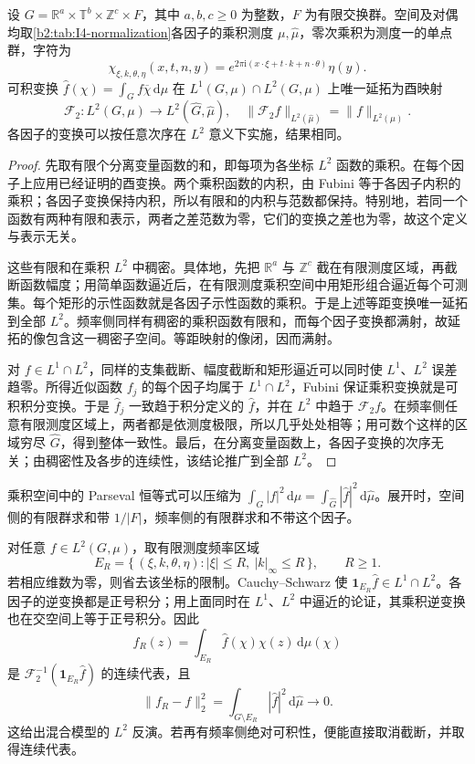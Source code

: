 \begin{proposition}\label{b2:prop:I4-product-plancherel}
设 \(G=\mathbb R^a\times\mathbb T^b\times\mathbb Z^c\times F\)，其中 \(a,b,c\ge0\) 为整数，\(F\) 为有限交换群。空间及对偶均取\cref{b2:tab:I4-normalization}各因子的乘积测度 \(\mu,\widehat\mu\)，零次乘积为测度一的单点群，字符为
\[
 \chi_{\xi,k,\theta,\eta}(x,t,n,y)
 =e^{2\pi\mathrm i(x\cdot\xi+t\cdot k+n\cdot\theta)}\eta(y).
\]
可积变换 \(\widehat f(\chi)=\int_G f\overline\chi\,\mathrm d\mu\) 在 \(L^1(G,\mu)\cap L^2(G,\mu)\) 上唯一延拓为酉映射
\[
 \mathcal F_2:L^2(G,\mu)\longrightarrow L^2(\widehat G,\widehat\mu),
 \quad \|\mathcal F_2f\|_{L^2(\widehat\mu)}=\|f\|_{L^2(\mu)}.
\]
各因子的变换可以按任意次序在 \(L^2\) 意义下实施，结果相同。
\end{proposition}
\begin{proof}
先取有限个分离变量函数的和，即每项为各坐标 \(L^2\) 函数的乘积。在每个因子上应用已经证明的酉变换。两个乘积函数的内积，由 Fubini 等于各因子内积的乘积；各因子变换保持内积，所以有限和的内积与范数都保持。特别地，若同一个函数有两种有限和表示，两者之差范数为零，它们的变换之差也为零，故这个定义与表示无关。

这些有限和在乘积 \(L^2\) 中稠密。具体地，先把 \(\mathbb R^a\) 与 \(\mathbb Z^c\) 截在有限测度区域，再截断函数幅度；用简单函数逼近后，在有限测度乘积空间中用矩形组合逼近每个可测集。每个矩形的示性函数就是各因子示性函数的乘积。于是上述等距变换唯一延拓到全部 \(L^2\)。频率侧同样有稠密的乘积函数有限和，而每个因子变换都满射，故延拓的像包含这一稠密子空间。等距映射的像闭，因而满射。

对 \(f\in L^1\cap L^2\)，同样的支集截断、幅度截断和矩形逼近可以同时使 \(L^1\)、\(L^2\) 误差趋零。所得近似函数 \(f_j\) 的每个因子均属于 \(L^1\cap L^2\)，Fubini 保证乘积变换就是可积积分变换。于是 \(\widehat f_j\) 一致趋于积分定义的 \(\widehat f\)，并在 \(L^2\) 中趋于 \(\mathcal F_2f\)。在频率侧任意有限测度区域上，两者都是依测度极限，所以几乎处处相等；用可数个这样的区域穷尽 \(\widehat G\)，得到整体一致性。最后，在分离变量函数上，各因子变换的次序无关；由稠密性及各步的连续性，该结论推广到全部 \(L^2\)。
\end{proof}

乘积空间中的 Parseval 恒等式可以压缩为 \(\int_G|f|^2\,\mathrm d\mu=\int_{\widehat G}|\widehat f|^2\,\mathrm d\widehat\mu\)。展开时，空间侧的有限群求和带 \(1/|F|\)，频率侧的有限群求和不带这个因子。

对任意 \(f\in L^2(G,\mu)\)，取有限测度频率区域
\[
 E_R=\{\, (\xi,k,\theta,\eta):|\xi|\le R,\ |k|_\infty\le R\,\},
 \qquad R\ge1.
\]
若相应维数为零，则省去该坐标的限制。Cauchy--Schwarz 使 \(\mathbf1_{E_R}\widehat f\in L^1\cap L^2\)。各因子的逆变换都是正号积分；用上面同时在 \(L^1\)、\(L^2\) 中逼近的论证，其乘积逆变换也在交空间上等于正号积分。因此
\[
 f_R(z)=\int_{E_R}\widehat f(\chi)\chi(z)\,\mathrm d\widehat\mu(\chi)
\]
是 \(\mathcal F_2^{-1}(\mathbf1_{E_R}\widehat f)\) 的连续代表，且
\[
 \|f_R-f\|_2^2
 =\int_{\widehat G\setminus E_R}|\widehat f|^2\,\mathrm d\widehat\mu
 \longrightarrow0.
\]
这给出混合模型的 \(L^2\) 反演。若再有频率侧绝对可积性，便能直接取消截断，并取得连续代表。

